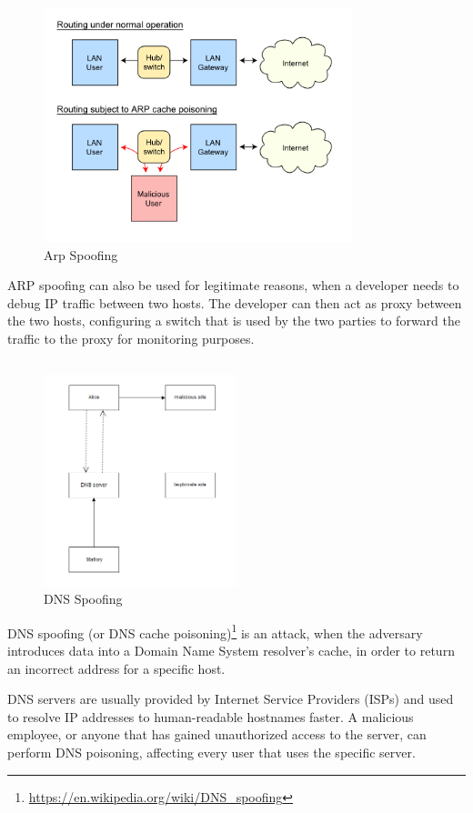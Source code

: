 \begin{figure}[H] \caption{Arp Spoofing} \centering
\includegraphics[width=0.8\textwidth]{diagrams/arp_spoofing.png}\end{figure}

ARP spoofing can also be used for legitimate reasons, when a developer needs to
debug IP traffic between two hosts. The developer can then act as proxy between
the two hosts, configuring a switch that is used by the two parties to forward
the traffic to the proxy for monitoring purposes.

\subsection{}

\begin{figure}[H] \caption{DNS Spoofing} \centering
\includegraphics[width=0.5\textwidth]{diagrams/dns_spoofing.png}\end{figure}

DNS spoofing (or DNS cache
poisoning)\footnote{\url{https://en.wikipedia.org/wiki/DNS_spoofing}} is an
attack, when the adversary introduces data into a Domain Name System resolver's
cache, in order to return an incorrect address for a specific host.

DNS servers are usually provided by Internet Service Providers (ISPs) and used
to resolve IP addresses to human-readable hostnames faster. A malicious
employee, or anyone that has gained unauthorized access to the server, can
perform DNS poisoning, affecting every user that uses the specific server.
